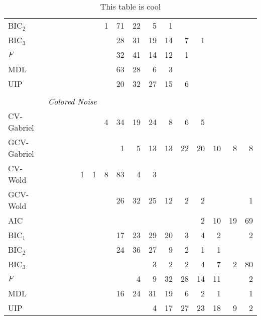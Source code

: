 \begin{table}
\begin{tabular}{lrrrrrrrrrrrrrrrr}
 BIC$_2$ &  &  &  &  &  &  &  1 &  71 &  22 &  5 &  1 &  &  &  &  & \\ 
 BIC$_3$ &  &  &  &  &  &  &  &  28 &  31 &  19 &  14 &  7 &  1 &  &  & \\ 
 $F$ &  &  &  &  &  &  &  &  32 &  41 &  14 &  12 &  1 &  &  &  & \\ 
 MDL &  &  &  &  &  &  &  &  63 &  28 &  6 &  3 &  &  &  &  & \\ 
 UIP &  &  &  &  &  &  &  &  20 &  32 &  27 &  15 &  6 &  &  &  & \\ 
        \\
        &\multicolumn{16}{l}{\scriptsize{\textit{Colored Noise}}} \\
CV-Gabriel &  &  &  &  &  &  &  4 &  34 &  19 &  24 &  8 &  6 &  5 &  &  & \\ 
 GCV-Gabriel &  &  &  &  &  &  &  &  1 &  5 &  13 &  13 &  22 &  20 &  10 &  8 &  8\\ 
 CV-Wold &  &  &  &  &  1 &  1 &  8 &  83 &  4 &  3 &  &  &  &  &  & \\ 
 GCV-Wold &  &  &  &  &  &  &  &  26 &  32 &  25 &  12 &  2 &  2 &  &  &  1\\ 
 AIC &  &  &  &  &  &  &  &  &  &  &  &  &  2 &  10 &  19 &  69\\ 
 BIC$_1$ &  &  &  &  &  &  &  &  17 &  23 &  29 &  20 &  3 &  4 &  2 &  &  2\\ 
 BIC$_2$ &  &  &  &  &  &  &  &  24 &  36 &  27 &  9 &  2 &  1 &  1 &  & \\ 
 BIC$_3$ &  &  &  &  &  &  &  &  &  &  3 &  2 &  2 &  4 &  7 &  2 &  80\\ 
 $F$ &  &  &  &  &  &  &  &  &  4 &  9 &  32 &  28 &  14 &  11 &  &  2\\ 
 MDL &  &  &  &  &  &  &  &  16 &  24 &  31 &  19 &  6 &  2 &  1 &  &  1\\ 
 UIP &  &  &  &  &  &  &  &  &  &  4 &  17 &  27 &  23 &  18 &  9 &  2\\ 
        \bottomrule
    \end{tabular}
    \caption{
        This table is cool
    }
\end{table}

